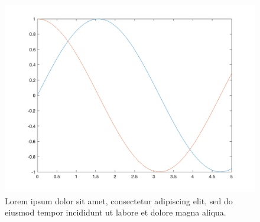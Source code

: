 \documentclass{article}
\begin{document}
    \begin{figure}[!htbp]
      \includegraphics[width = \textwidth]{./figure.png}
      \caption{Lorem ipsum dolor sit amet, consectetur adipiscing elit, sed do eiusmod tempor incididunt ut labore et dolore magna aliqua.}
    \end{figure}
    \inputminted[breaklines]{matlab}{./code.m}
  
  
\end{document}
